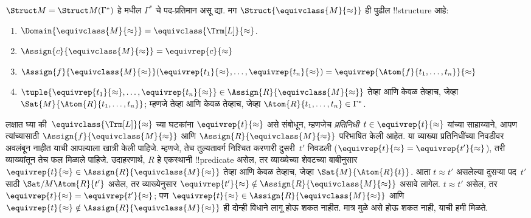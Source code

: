 \documentclass[../../../include/open-logic-section]{subfiles}
\begin{document}
\begin{defn}
$\Struct M = \Struct M(\Gamma^*)$ हे  मधील
$\Gamma^*$ चे पद-प्रतिमान असू द्या. मग
$\Struct{\equivclass{M}{\approx}}$ ही पुढील !!{structure} आहे:
\begin{enumerate}
\item $\Domain{\equivclass{M}{\approx}} = \equivclass{\Trm[L]}{\approx}$.
\item $\Assign{c}{\equivclass{M}{\approx}} = \equivrep{c}{\approx}$
\item $\Assign{f}{\equivclass{M}{\approx}}(\equivrep{t_1}{\approx}, \dots,
  \equivrep{t_n}{\approx}) = \equivrep{\Atom{f}{t_1,\dots, t_n}}{\approx}$
\item $\tuple{\equivrep{t_1}{\approx}, \dots, \equivrep{t_n}{\approx}} \in
  \Assign{R}{\equivclass{M}{\approx}}$ तेव्हा आणि केवळ तेव्हाच, जेव्हा
  $\Sat{M}{\Atom{R}{t_1,\dots, t_n}}$; म्हणजे तेव्हा आणि केवळ तेव्हाच,
  जेव्हा $\Atom{R}{t_1,\dots, t_n} \in \Gamma^*$.
\end{enumerate}
\end{defn}

\begin{explain}
लक्षात घ्या की~$\equivclass{\Trm[L]}{\approx}$ च्या घटकांना
$\equivrep{t}{\approx}$ असे संबोधून, म्हणजेच
\emph{प्रतिनिधी}~$t \in \equivrep{t}{\approx}$ यांच्या साहाय्याने,
आपण त्यांच्यासाठी $\Assign{f}{\equivclass{M}{\approx}}$ आणि
$\Assign{R}{\equivclass{M}{\approx}}$ परिभाषित केली आहेत. या व्याख्या
प्रतिनिधींच्या निवडीवर अवलंबून नाहीत याची आपल्याला खात्री केली पाहिजे.
म्हणजे, तेच तुल्यतावर्ग निश्चित करणारी दुसरी~$t'$ निवडली
($\equivrep{t}{\approx} = \equivrep{t'}{\approx}$), तरी व्याख्यांतून तेच
फल मिळाले पाहिजे. उदाहरणार्थ, $R$ हे एकस्थानी !!{predicate} असेल, तर
व्याख्येच्या शेवटच्या बाबीनुसार $\equivrep{t}{\approx} \in
\Assign{R}{\equivclass{M}{\approx}}$ तेव्हा आणि केवळ तेव्हाच, जेव्हा
$\Sat{M}{\Atom{R}{t}}$. आता $t \approx t'$ असलेल्या दुसऱ्या
पद~$t'$ साठी $\Sat/{M}{\Atom{R}{t'}}$ असेल, तर व्याख्येनुसार
$\equivrep{t'}{\approx} \notin \Assign{R}{\equivclass{M}{\approx}}$ असावे
लागेल. $t \approx t'$ असेल, तर $\equivrep{t}{\approx} =
\equivrep{t'}{\approx}$; पण $\equivrep{t}{\approx} \in
\Assign{R}{\equivclass{M}{\approx}}$ आणि $\equivrep{t}{\approx}
\notin \Assign{R}{\equivclass{M}{\approx}}$ ही दोन्ही विधाने लागू होऊ
शकत नाहीत. मात्र  मुळे असे होऊ शकत नाही, याची
हमी मिळते.
\end{explain}
\end{document}

